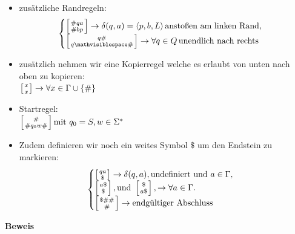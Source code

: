 \documentclass[12pt,a4paper]{article}
\begin{document}
\begin{itemize}
$$$$
\item zusätzliche Randregeln:$$
\begin{cases}
\left[ {\# qa \atop \# bp} \right] \rightarrow \delta(q, a) = \langle p, b, L \rangle \, \text{anstoßen am linken Rand},\\
\left[ {q \# \atop q \mathvisiblespace \# } \right] \rightarrow \forall q \in Q \, \text{unendlich nach rechts}\\
\end{cases}
$$
\item zusätzlich nehmen wir eine Kopierregel welche es erlaubt von unten nach oben zu kopieren:\\
$\left[ {x \atop x} \right] \rightarrow \forall x \in \Gamma \cup \{ \# \}$
\item Startregel:\\
$ \left[ {\# \atop \# q_0 w \#} \right] \text{mit } q_0 = S, w \in \Sigma^*$
\item Zudem definieren wir noch ein weites Symbol $ \$ $ um den Endstein zu markieren:$$
\begin{cases}
\left[ {qa \atop \$} \right] \rightarrow \delta(q, a), \text{undefiniert und } a\in \Gamma,\\
\left[ {a\$ \atop \$} \right], \text{und } \left[ {\$ \atop a\$} \right], \rightarrow \forall a \in \Gamma.\\
\left[ {\$ \# \# \atop \#} \right] \rightarrow \text{endgültiger Abschluss}
\end{cases}
$$
\end{itemize}
\textbf{Beweis}
\end{document}

